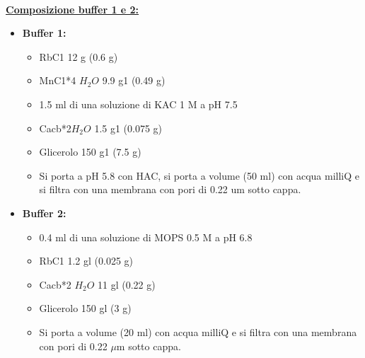 \documentclass{extarticle}
\begin{document}
\paragraph{}
\underline{\textbf{Composizione buffer 1 e 2:}}\\
\begin{minipage}{0.5\textwidth}
    \begin{itemize}
        \item \textbf{Buffer 1:}\\
        \begin{itemize}
            \item RbC1 12 g (0.6 g)
            \item MnC1*4  $H_{2}O$ 9.9 g1 (0.49 g)
            \item 1.5 ml di una soluzione di KAC 1 M a pH 7.5
            \item Cacb*2$H_{2}O$ 1.5 g1 (0.075 g)
            \item Glicerolo 150 g1 (7.5 g)
            \item Si porta a pH 5.8 con HAC, si porta a volume (50 ml) con acqua milliQ e si filtra con una membrana con pori di 0.22 um sotto cappa.
        \end{itemize}
    \end{itemize}
\end{minipage} \hfill
\begin{minipage}{0.50\textwidth} 
    \begin{itemize}
        \item \textbf{Buffer 2:}\\
        \begin{itemize}
            \item 0.4 ml di una soluzione di MOPS 0.5 M a pH 6.8
            \item RbC1 1.2 gl (0.025 g)
            \item Cacb*2  $H_{2}O$ 11 gl (0.22 g)
            \item Glicerolo 150 gl (3 g)
            \item Si porta a volume (20 ml) con acqua milliQ e si filtra con una membrana con pori di 0.22 $\mu$m sotto cappa.
        \end{itemize}
    \end{itemize}
\end{minipage}
\end{document}
